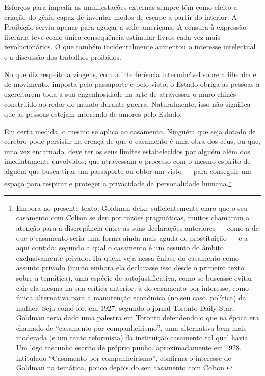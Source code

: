 Esforços para impedir as manifestações externas sempre têm como efeito a
criação do gênio capaz de inventar modos de escape a partir do interior.
A Proibição serviu apenas para aguçar a sede americana. A censura à
expressão literária teve como única consequência estimular livros cada
vez mais revolucionários. O que também incidentalmente aumentou o
interesse intelectual e a discussão dos trabalhos proibidos.

No que diz respeito a viagens, com a interferência interminável sobre 
a liberdade de movimento, imposta pelo passaporte e pelo visto, o Estado obriga as
pessoas a exercitarem toda a sua engenhosidade na arte de atravessar o
muro chinês construído ao redor do mundo durante guerra. Naturalmente, isso não
significa que as pessoas estejam morrendo de amores pelo Estado.

Em certa medida, o mesmo se aplica ao casamento. Ninguém
que seja dotado de cérebro pode persistir na crença de que o
casamento é uma obra dos céus, ou
que, uma vez encarnado, deve ter os seus limites estabelecidos por alguém além dos imediatamente envolvidos; que atravessam o processo com o mesmo espírito
de alguém que busca tirar um passaporte ou obter um visto --- para
conseguir um espaço para respirar e proteger a privacidade da
personalidade humana.\footnote{Embora no presente texto, Goldman deixe
  suficientemente claro que o seu casamento com Colton se deu por razões
  pragmáticas, muitos chamaram a atenção para a discrepância entre as
  suas declarações anteriores --- como a de que o casamento seria uma forma
  ainda mais aguda de prostituição --- e a aqui contida: segundo a qual o
  casamento é um assunto do âmbito exclusivamente privado. Há quem veja
  nessa ênfase do casamento como assunto privado (muito embora ela declarasse isso desde o  primeiro
  texto sobre a temática), uma espécie de autojustificativa, como se
  buscasse evitar cair ela mesma na sua crítica anterior: a do
  casamento por interesse, como única alternativa para a manutenção
  econômica (no seu caso, política) da mulher. Seja como for, em 1927,
  segundo o jornal Toronto Daily Star, Goldman teria dado uma palestra
  em Toronto defendendo o que na época era chamado de ``casamento por
  companheirismo'', uma alternativa bem mais moderada (e um tanto
  reformista) da instituição casamento tal qual havia. Um logo rascunho
  escrito de próprio punho, aproximadamente em 1928, intitulado
  ``Casamento por companheirismo'', confirma o interesse de Goldman na
  temática, pouco depois do seu casamento com Colton.}

